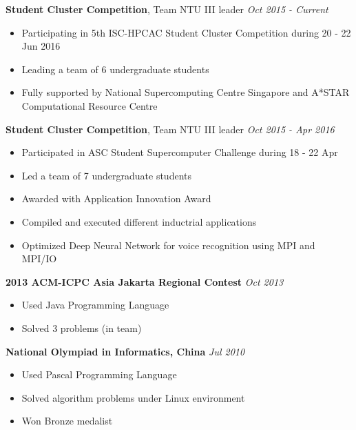 \documentclass[a4paper, 12pt]{article}
\newenvironment{changemargin}[2]{%
  \begin{list}{}{%
      \setlength{\topsep}{0pt}%
      \setlength{\leftmargin}{#1}%
      \setlength{\rightmargin}{#2}%
      \setlength{\listparindent}{\parindent}%
      \setlength{\itemindent}{\parindent}%
      \setlength{\parsep}{\parskip}%
    }%
  \item[]}{\end{list}
}
\newenvironment{body}
{
\vspace*{-16pt}
\begin{changemargin}{-0.25in}{-0.5in}
}
{
\end{changemargin}
}
\begin{document}
\begin{body}
  \vspace{14pt}

  \textbf{Student Cluster Competition}, {Team NTU III leader} \hfill \emph{Oct 2015 - Current}\\
  \vspace*{-6pt}
  \begin{itemize} \itemsep -0pt  \small
  \item Participating in 5th ISC-HPCAC Student Cluster Competition during 20 - 22 Jun 2016
  \item Leading a team of 6 undergraduate students
  \item Fully supported by National Supercomputing Centre Singapore and A*STAR Computational Resource Centre
  \end{itemize}

  \textbf{Student Cluster Competition}, {Team NTU III leader} \hfill \emph{Oct 2015 - Apr 2016}\\
  \vspace*{-6pt}
  \begin{itemize} \itemsep -0pt  \small
  \item Participated in ASC Student Supercomputer Challenge during 18 - 22 Apr
  \item Led a team of 7 undergraduate students
  \item Awarded with Application Innovation Award
  \item Compiled and executed different inductrial applications
  \item Optimized Deep Neural Network for voice recognition using MPI and MPI/IO
  \end{itemize}

  \textbf{2013 ACM-ICPC Asia Jakarta Regional Contest} \hfill \emph{Oct 2013}\\
  \vspace*{-6pt}
  \begin{itemize} \itemsep -0pt  \small
  \item Used Java Programming Language
  \item Solved 3 problems (in team)
  \end{itemize}

  \textbf{National Olympiad in Informatics, China} \hfill \emph{Jul 2010}\\
  \vspace*{-6pt}
  \begin{itemize} \itemsep -0pt \small
  \item Used Pascal Programming Language
  \item Solved algorithm problems under Linux environment
  \item Won Bronze medalist
  \end{itemize}


\end{body}
\end{document}
